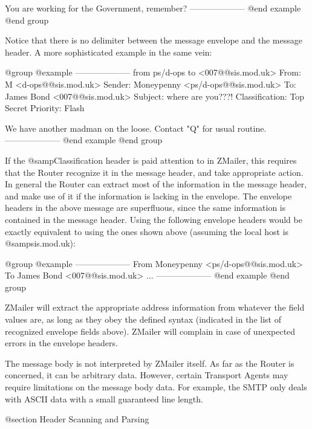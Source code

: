 You are working for the Government, remember?
--------------------
@end example
@end group

Notice that there is no delimiter between the message envelope and the
message header.  A more sophisticated example in the same vein:

@group
@example
--------------------
from ps/d-ops
to <007@@sis.mod.uk>
From: M <d-ops@@sis.mod.uk>
Sender: Moneypenny <ps/d-ops@@sis.mod.uk>
To: James Bond <007@@sis.mod.uk>
Subject: where are you???!
Classification: Top Secret
Priority: Flash

We have another madman on the loose.  Contact "Q" for usual routine.
--------------------
@end example
@end group

If the @samp{Classification} header is paid attention to in ZMailer,
this requires that the Router recognize it in the message header,
and take appropriate action.
In general the Router can extract most of the information in the message
header, and make use of it if the information is lacking in the envelope.
The envelope headers in the above message are superfluous, since the same
information is contained in the message header.
Using the following envelope headers would be exactly equivalent to using
the ones shown above (assuming the local host is @samp{sis.mod.uk}):

@group
@example
--------------------
From Moneypenny <ps/d-ops@@sis.mod.uk>
To James Bond <007@@sis.mod.uk>
...
--------------------
@end example
@end group

ZMailer will extract the appropriate address information from whatever
the field values are, as long as they obey the defined syntax (indicated
in the list of recognized envelope fields above).
ZMailer will complain in case of unexpected errors in the envelope headers.

The message body is not interpreted by ZMailer itself.
As far as the Router is concerned, it can be arbitrary data.
However, certain Transport Agents may require limitations on
the message body data.
For example, the SMTP only deals with ASCII data with a small
guaranteed line length.

@section Header Scanning and Parsing

